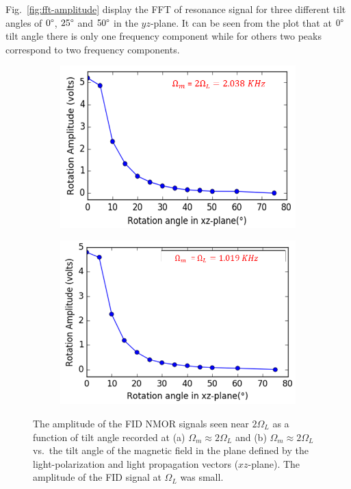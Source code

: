 Fig.~\ref{fig:fft-amplitude} display the FFT of resonance signal for
three different tilt angles of $0\degree$, $25\degree$ and $50\degree$
in the $yz$-plane. It can be seen from the plot that at $0\degree$
tilt angle there is only one frequency component while for others two
peaks correspond to two frequency components.

\begin{figure}
  \centering
  \begin{subfigure}[b]{0.49\textwidth}
    \centering
    \includegraphics[width=\textwidth]{figures/tilt_x_larmor.png}
    \caption{}
    \label{fig:y equals x}
  \end{subfigure}
  \hfill
  \begin{subfigure}[b]{0.49\textwidth}
    \centering
    \includegraphics[width=\textwidth]{figures/tilt_x_2larmor.png}
    \caption{}
    \label{fig:three sin x}
  \end{subfigure}
  \caption{The amplitude of the FID NMOR signals seen near $2\Omega_L$
    as a function of tilt angle recorded at (a) $\Omega_m\approx
    2\Omega_L$ and (b) $\Omega_m\approx 2\Omega_L$ vs.~the tilt angle
    of the magnetic field in the plane defined by the
    light-polarization and light propagation vectors ($xz$-plane).
    The amplitude of the FID signal at $\Omega_L$ was
    small.\label{fig:tilted-wrong}}
\end{figure}
